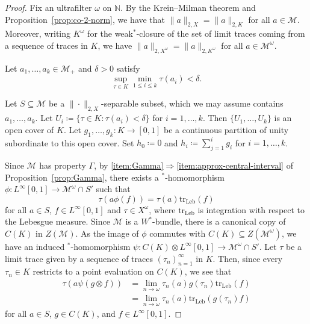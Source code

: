 \documentclass[a4paper,11pt]{amsart}
\theoremstyle{definition}
\numberwithin{equation}{section}
\numberwithin{theorem}{section}
\newcommand{\N}{\mathbb N}
\newcommand{\tr}{\mathrm{tr}}
\newcommand{\M}{\mathcal{M}}
\begin{document}
\begin{proof}
	Fix an ultrafilter $\omega$ on $\N$. 
	By the Krein--Milman theorem and Proposition~\ref{prop:co-2-norm}, we have that $\|a\|_{2,X} = \|a\|_{2,K}$ for all $a \in \M$. Moreover, writing $K^\omega$ for the weak$^*$-closure of the set of limit traces coming from a sequence of traces in $K$, we have $\|a\|_{2,X^\omega} =  \|a\|_{2,K^\omega}$ for all $a \in \M^\omega$. 

	Let $a_1,\ldots,a_k \in \M_+$ and $\delta > 0$ satisfy
	\begin{equation}
		\sup_{\tau \in K} \min_{1\leq i\leq k} \tau(a_i) < \delta.
	\end{equation}
	
	Let $S \subseteq \M$ be a $\|\cdot\|_{2,X}$-separable subset, which we may assume contains $a_1,\ldots,a_k$. 
	Let $U_i \coloneqq \{\tau \in K: \tau(a_i) < \delta \}$ for $i=1,\ldots,k$. Then $\{U_1,\ldots,U_k\}$ is an open cover of $K$. Let $g_1,\ldots,g_k\colon K \rightarrow  [0,1]$ be a continuous partition of unity subordinate to this open cover. Set $h_0 \coloneqq 0$ and $h_i \coloneqq \sum_{j=1}^{i} g_i$ for $i=1,\ldots,k$.
	
	Since $\M$ has property $\Gamma$, by \ref{item:Gamma}$\Rightarrow$\ref{item:approx-central-interval} of  Proposition~\ref{prop:Gamma}, there exists a $^*$-homomorphism $\phi \colon L^\infty[0, 1] \rightarrow \M^\omega \cap S'$ such that 
	\begin{equation}
		\tau(a \phi(f)) = \tau(a)\tr_{\mathrm{Leb}}(f)
	\end{equation}
	for all $a \in S$, $f \in L^\infty[0, 1]$ and $\tau \in X^\omega$, where $\tr_{\mathrm{Leb}}$ is integration with respect to the Lebesgue measure.
	Since $\M$ is a $W^*$-bundle, there is a canonical copy of $C(K)$ in $Z(\M)$. 
	As the image of $\phi$ commutes with $C(K) \subseteq  Z(\M^\omega)$, we have an induced $^*$-homomorphism $\psi\colon C(K) \otimes L^\infty[0, 1] \rightarrow \M^\omega \cap S'$.  Let $\tau$ be a limit trace given by a sequence of traces $(\tau_n)_{n=1}^\infty $ in $K$. Then, since every $\tau_n \in K$ restricts to a point evaluation on $C(K)$, we see that  
	\begin{equation}\begin{split}
		\tau(a\psi(g \otimes f)) &= \lim_{n\to\omega} \tau_n(a)g(\tau_n) \tr_{\mathrm{Leb}}(f)\\
		&= \lim_{n\to\omega} \tau_n(a) \tr_{\mathrm{Leb}}(g(\tau_n)f)
	\end{split}\end{equation} 
	for all $a \in S$, $g \in C(K)$, and $f \in L^\infty[0, 1]$. 
 

\end{proof}
\end{document}
